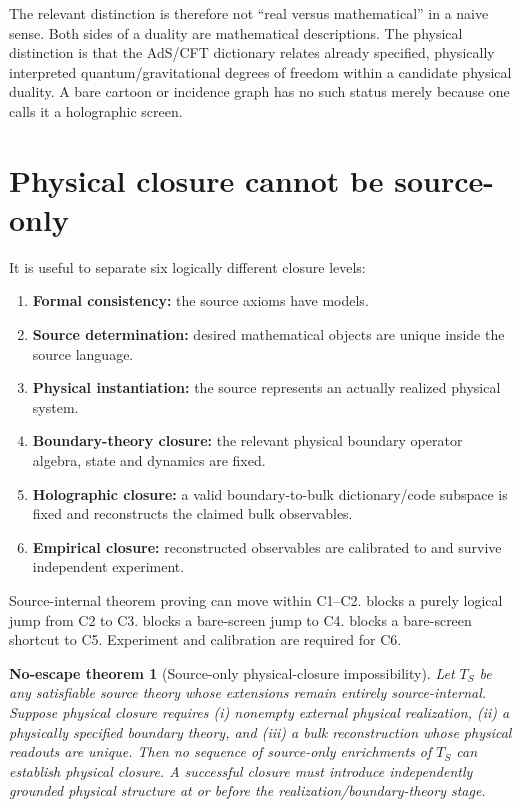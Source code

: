 \documentclass[10pt,a4paper]{article}
\newtheorem{noescape}[theorem]{No-escape theorem}
\theoremstyle{definition}
\theoremstyle{remark}
\begin{document}
The relevant distinction is therefore not ``real versus mathematical'' in a
naive sense.  Both sides of a duality are mathematical descriptions.  The
physical distinction is that the AdS/CFT dictionary relates already specified,
physically interpreted quantum/gravitational degrees of freedom within a
candidate physical duality.  A bare cartoon or incidence graph has no such
status merely because one calls it a holographic screen.

\section{Physical closure cannot be source-only}
\label{sec:closure}

It is useful to separate six logically different closure levels:
\begin{enumerate}[label=\textbf{C\arabic*.}]
\item \textbf{Formal consistency:} the source axioms have models.
\item \textbf{Source determination:} desired mathematical objects are unique
inside the source language.
\item \textbf{Physical instantiation:} the source represents an actually
realized physical system.
\item \textbf{Boundary-theory closure:} the relevant physical boundary
operator algebra, state and dynamics are fixed.
\item \textbf{Holographic closure:} a valid boundary-to-bulk dictionary/code
subspace is fixed and reconstructs the claimed bulk observables.
\item \textbf{Empirical closure:} reconstructed observables are calibrated to
and survive independent experiment.
\end{enumerate}

Source-internal theorem proving can move within C1--C2.  
blocks a purely logical jump from C2 to C3.   blocks a
bare-screen jump to C4.   blocks a bare-screen shortcut to C5.
Experiment and calibration are required for C6.

\begin{noescape}[Source-only physical-closure impossibility]
\label{thm:closure-impossible}
Let \(T_S\) be any satisfiable source theory whose extensions remain entirely
source-internal.  Suppose physical closure requires (i) nonempty external
physical realization, (ii) a physically specified boundary theory, and (iii)
a bulk reconstruction whose physical readouts are unique.  Then no sequence
of source-only enrichments of \(T_S\) can establish physical closure.  A
successful closure must introduce independently grounded physical structure
at or before the realization/boundary-theory stage.
\end{noescape}
\end{document}
